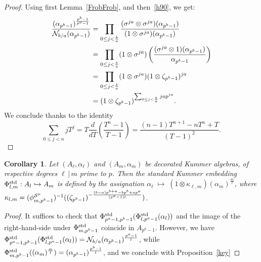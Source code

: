 \documentclass{sig-alternate}
\newtheorem{corollary}[theorem]{Corollary}
\begin{document}
\begin{proof}
Using first Lemma~\ref{FrobFrob}, and then~\eqref{h90}, we get:
\begin{equation*}
\begin{split}
\frac{(\alpha_{p^b-1})^{\frac{p^b-1}{p^a-1}}}{\mathcal{N}_{b/a}(\alpha_{p^b-1})}&=\prod_{0\leq j<\frac{b}{a}}\frac{(\sigma^{ja}\otimes\sigma^{ja})(\alpha_{p^b-1})}{(1\otimes\sigma^{ja})(\alpha_{p^b-1})}\\
&=\prod_{0\leq j<\frac{b}{a}}(1\otimes\sigma^{ja})\left(\frac{(\sigma^{ja}\otimes 1)(\alpha_{p^b-1})}{\alpha_{p^b-1}}\right)\\
&=\prod_{0\leq j<\frac{b}{a}}(1\otimes\sigma^{ja})(1\otimes\zeta_{p^b-1})^{ja}\\
&=(1\otimes\zeta_{p^b-1})^{\sum_{0\leq j<\frac{b}{a}}jap^{ja}}.
\end{split}
\end{equation*}
We conclude thanks to the identity
\[ \sum_{0\leq j<n}jT^j=T\frac{d}{dT}\!\left(\frac{T^n-1}{T-1}\right)=\frac{(n-1)T^{n+1}-nT^n+T}{(T-1)^2}. \]
\end{proof}
\begin{corollary}
\label{explicit_general_standard_embedding}
Let $(A_\ell,\alpha_\ell)$ and $(A_m,\alpha_m)$ be decorated Kummer algebras,
of respective degrees $\ell\,|\,m$ prime to $p$.
Then the standard Kummer embedding ${\Phi^{\mathrm{std}}_{{l},{m}}}:A_l\hookrightarrow A_m$
is defined by the assignation
$\alpha_\ell\;\mapsto\;(1\otimes\kappa_{\ell,m})(\alpha_m)^{\frac{m}{\ell}}$, where
$\kappa_{l,m}=({\phi^{\mathcal{S}^\mu}_{{m},{p^b-1}}})^{-1}((\zeta_{p^b-1})^{-\frac{(b-a)p^{b+a}-bp^b+ap^a}{(p^a-1)l}})$.
\end{corollary}
\begin{proof}
It suffices to check that ${\Phi^{\mathrm{std}}_{{p^a-1},{p^b-1}}}({\Phi^{\mathrm{std}}_{{l},{p^a-1}}}(\alpha_l))$
and the image of the right-hand-side under ${\Phi^{\mathrm{std}}_{{m},{p^b-1}}}$ coincide in $A_{p^b-1}$.
However, we have ${\Phi^{\mathrm{std}}_{{p^a-1},{p^b-1}}}({\Phi^{\mathrm{std}}_{{l},{p^a-1}}}(\alpha_l))=\mathcal{N}_{b/a}(\alpha_{p^b-1})^{\frac{p^a-1}{l}}$,
while ${\Phi^{\mathrm{std}}_{{m},{p^b-1}}}((\alpha_m)^{\frac{m}{l}})=(\alpha_{p^b-1})^{\frac{p^b-1}{l}}$,
and we conclude with Proposition~\ref{key}
\end{proof}
\end{document}
